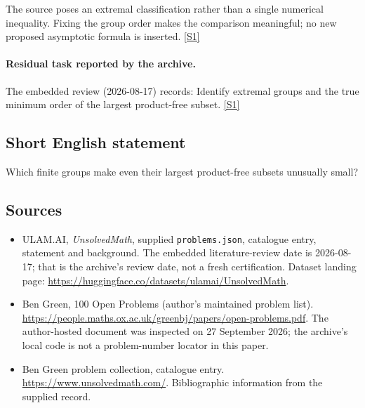\documentclass[11pt,a4paper]{article}
\newcommand{\sref}[2]{\hyperlink{source:#1:#2}{[S#2]}}
\begin{document}
The source poses an extremal classification rather than a single numerical inequality. Fixing the group order makes the comparison meaningful; no new proposed asymptotic formula is inserted. \sref{statement}{1}

\paragraph{Residual task reported by the archive.}

The embedded review (2026-08-17) records: Identify extremal groups and the true minimum order of the largest product-free subset. \sref{statement}{1}

\subsection{Short English statement}

Which finite groups make even their largest product-free subsets unusually small?

\subsection{Sources}

{\small

\begin{itemize}

\item[\hypertarget{source:statement:1}{S1}] ULAM.AI, \emph{UnsolvedMath}, supplied \texttt{problems.json}, catalogue entry, statement and background. The embedded literature-review date is 2026-08-17; that is the archive’s review date, not a fresh certification. Dataset landing page: \url{https://huggingface.co/datasets/ulamai/UnsolvedMath}.

\item[\hypertarget{source:statement:2}{S2}] Ben Green, 100 Open Problems (author’s maintained problem list). \url{https://people.maths.ox.ac.uk/greenbj/papers/open-problems.pdf}. The author-hosted document was inspected on 27 September 2026; the archive’s local code is not a problem-number locator in this paper.

\item[\hypertarget{source:statement:3}{S3}] Ben Green problem collection, catalogue entry. \url{https://www.unsolvedmath.com/}. Bibliographic information from the supplied record.

\end{itemize}

}

\label{end:statement}
\end{document}
